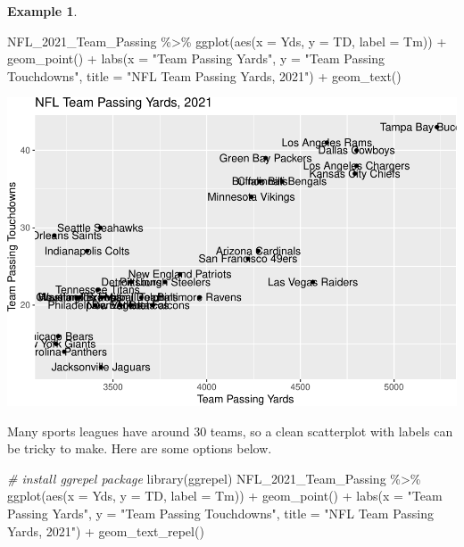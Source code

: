 \documentclass[
  11pt,
]{book}
\newenvironment{Shaded}{\begin{snugshade}}{\end{snugshade}}
\newcommand{\AttributeTok}[1]{\textcolor[rgb]{0.77,0.63,0.00}{#1}}
\newcommand{\CommentTok}[1]{\textcolor[rgb]{0.56,0.35,0.01}{\textit{#1}}}
\newcommand{\FunctionTok}[1]{\textcolor[rgb]{0.00,0.00,0.00}{#1}}
\newcommand{\NormalTok}[1]{#1}
\newcommand{\SpecialCharTok}[1]{\textcolor[rgb]{0.00,0.00,0.00}{#1}}
\newcommand{\StringTok}[1]{\textcolor[rgb]{0.31,0.60,0.02}{#1}}
\theoremstyle{definition}
\theoremstyle{definition}
\newtheorem{example}{Example}[chapter]
\theoremstyle{definition}
\theoremstyle{definition}
\theoremstyle{remark}
\begin{document}
\begin{example}
\begin{Shaded}
\begin{Highlighting}[]
\NormalTok{NFL\_2021\_Team\_Passing }\SpecialCharTok{\%\textgreater{}\%}
    \FunctionTok{ggplot}\NormalTok{(}\FunctionTok{aes}\NormalTok{(}\AttributeTok{x =}\NormalTok{ Yds, }\AttributeTok{y =}\NormalTok{ TD, }\AttributeTok{label =}\NormalTok{ Tm)) }\SpecialCharTok{+} \FunctionTok{geom\_point}\NormalTok{() }\SpecialCharTok{+} \FunctionTok{labs}\NormalTok{(}\AttributeTok{x =} \StringTok{"Team Passing Yards"}\NormalTok{,}
    \AttributeTok{y =} \StringTok{"Team Passing Touchdowns"}\NormalTok{, }\AttributeTok{title =} \StringTok{"NFL Team Passing Yards, 2021"}\NormalTok{) }\SpecialCharTok{+} \FunctionTok{geom\_text}\NormalTok{()}
\end{Highlighting}
\end{Shaded}

\includegraphics{series_files/figure-latex/scatter2-1.pdf}

\vfill
\newpage

Many sports leagues have around 30 teams, so a clean scatterplot with labels can be tricky to make. Here are some options below.

\begin{Shaded}
\begin{Highlighting}[]
\CommentTok{\# install ggrepel package}
\FunctionTok{library}\NormalTok{(ggrepel)}
\NormalTok{NFL\_2021\_Team\_Passing }\SpecialCharTok{\%\textgreater{}\%}
    \FunctionTok{ggplot}\NormalTok{(}\FunctionTok{aes}\NormalTok{(}\AttributeTok{x =}\NormalTok{ Yds, }\AttributeTok{y =}\NormalTok{ TD, }\AttributeTok{label =}\NormalTok{ Tm)) }\SpecialCharTok{+} \FunctionTok{geom\_point}\NormalTok{() }\SpecialCharTok{+} \FunctionTok{labs}\NormalTok{(}\AttributeTok{x =} \StringTok{"Team Passing Yards"}\NormalTok{,}
    \AttributeTok{y =} \StringTok{"Team Passing Touchdowns"}\NormalTok{, }\AttributeTok{title =} \StringTok{"NFL Team Passing Yards, 2021"}\NormalTok{) }\SpecialCharTok{+} \FunctionTok{geom\_text\_repel}\NormalTok{()}
\end{Highlighting}
\end{Shaded}


\end{example}
\end{document}
